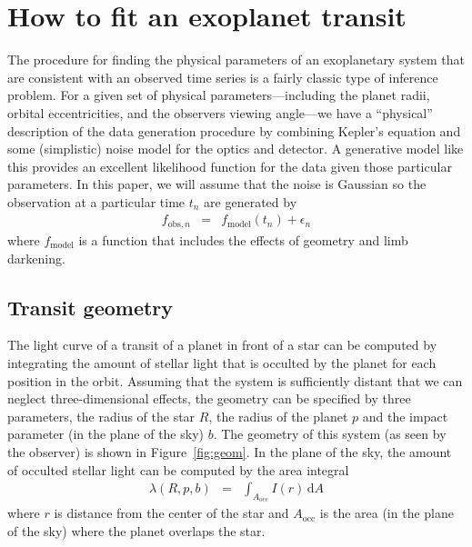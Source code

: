 \documentclass[12pt,preprint]{aastex}
\newcommand{\Fig}[1]{Figure~\ref{fig:#1}}
\newcommand{\fig}[1]{\Fig{#1}}
\newcommand{\eqlabel}[1]{\label{eq:#1}}
\newcommand{\dd}{\mathrm{d}}
\begin{document}
\section{How to fit an exoplanet transit}

The procedure for finding the physical parameters of an exoplanetary system
that are consistent with an observed time series is a fairly classic type of
inference problem. For a given set of physical parameters---including the
planet radii, orbital eccentricities, and the observers viewing angle---we
have a ``physical'' description of the data generation procedure by combining
Kepler's equation and some (simplistic) noise model for the optics and
detector. A generative model like this provides an excellent likelihood
function for the data given those particular parameters. In this paper, we
will assume that the noise is Gaussian so the observation at a particular time
$t_n$ are generated by
\begin{eqnarray}
    f_{\mathrm{obs},n} & = & f_\mathrm{model} (t_n) + \epsilon_n
\end{eqnarray}
where $f_\mathrm{model}$ is a function that includes the effects of geometry
and limb darkening.

\subsection{Transit geometry}

The light curve of a transit of a planet in front of a star can be computed by
integrating the amount of stellar light that is occulted by the planet for
each position in the orbit. Assuming that the system is sufficiently distant
that we can neglect three-dimensional effects, the geometry can be specified
by three parameters, the radius of the star $R$, the radius of the planet $p$
and the impact parameter (in the plane of the sky) $b$. The geometry
of this system (as seen by the observer) is shown in \fig{geom}. In the plane
of the sky, the amount of occulted stellar light can be computed by the area
integral
\begin{eqnarray}\eqlabel{general-occ}
    \lambda (R, p, b) & = & \int_{A_\mathrm{occ}} I(r) \, \dd A
\end{eqnarray}
where $r$ is distance from the center of the star and $A_\mathrm{occ}$ is the
area (in the plane of the sky) where the planet overlaps the star.
\end{document}

